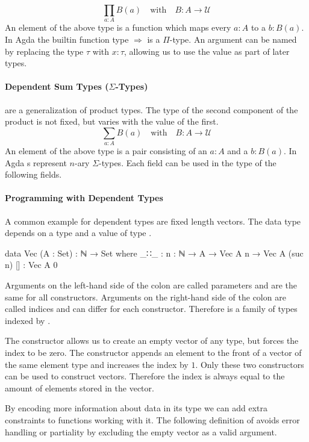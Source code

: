 \documentclass[10pt,a4paper,twoside]{report}
\begin{document}
$$
\prod_{a : A} B(a) \quad \text{with}\quad B : A \rightarrow\mathcal{U}
$$
An element of the above type is a function which maps every $a : A$ to a $b :
B(a)$.
In Agda the builtin function type $\Rightarrow$ is a $\Pi$-type.
An argument can be named by replacing the type $\tau$ with $x : \tau$, allowing
us to use the value as part of later types.

\paragraph{Dependent Sum Types ($\Sigma$-Types)} are a generalization of product
types.
The type of the second component of the product is not fixed, but varies with
the value of the first.
$$
\sum_{a : A} B(a) \quad \text{with}\quad B : A \rightarrow\mathcal{U}
$$
An element of the above type is a pair consisting of an $a : A$ and a $b : B(a)$.
In Agda s represent $n$-ary $\Sigma$-types.
Each field can be used in the type of the following fields.

\paragraph{Programming with Dependent Types}

A common example for dependent types are fixed length vectors.
The data type depends on a type  and a value of type
.

\begin{code}
data Vec (A : Set) : ℕ → Set where
  _∷_  : {n : ℕ} → A → Vec A n → Vec A (suc n)
  []   : Vec A 0
\end{code}
Arguments on the left-hand side of the colon are called parameters and are the
same for all constructors.
Arguments on the right-hand side of the colon are called indices and can differ
for each constructor.
Therefore \AgdaSpace{} is a family of types
indexed by .

The \AgdaInductiveConstructor{[]} constructor allows us to create an empty
vector of any type, but forces the index to be zero.
The  constructor appends an element to the front
of a vector of the same element type and increases the index by $1$.
Only these two constructors can be used to construct vectors.
Therefore the index is always equal to the amount of elements stored in the
vector.

By encoding more information about data in its type we can add extra constraints
to functions working with it.
The following definition of  avoids error handling or
partiality by excluding the empty vector as a valid argument.
\end{document}
